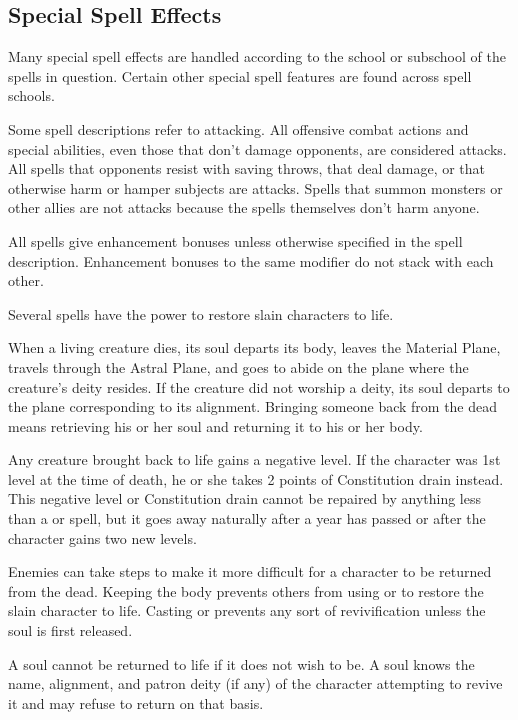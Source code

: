\subsection{Special Spell Effects}
Many special spell effects are handled according to the school or subschool of the
spells in question. Certain other special spell features are found across spell schools.

 Some spell descriptions refer to attacking. All offensive combat actions and special abilities, even those that don't damage opponents, are considered attacks. All spells that opponents resist with saving throws, that deal damage, or that otherwise harm or hamper subjects are attacks. Spells that summon monsters or other allies are not attacks because the spells themselves don't harm anyone.

 All spells give enhancement bonuses unless otherwise specified in the spell description. Enhancement bonuses to the same modifier do not stack with each other.

\label{Bringing Back the Dead}
 Several spells have the power to restore slain characters to life.

When a living creature dies, its soul departs its body, leaves the Material Plane, travels through the Astral Plane, and goes to abide on the plane where the creature's deity resides. If the creature did not worship a deity, its soul departs to the plane corresponding to its alignment. Bringing someone back from the dead means retrieving his or her soul and returning it to his or her body.

 Any creature brought back to life gains a negative level. If the character was 1st level at the time of death, he or she takes 2 points of Constitution drain instead. This negative level or Constitution drain cannot be repaired by anything less than a  or  spell, but it goes away naturally after a year has passed or after the character gains two new levels.

 Enemies can take steps to make it more difficult for a character to be returned from the dead. Keeping the body prevents others from using   or  to restore the slain character to life. Casting  or  prevents any sort of revivification unless the soul is first released.

 A soul cannot be returned to life if it does not wish to be. A soul knows the name, alignment, and patron deity (if any) of the character attempting to revive it and may refuse to return on that basis.

